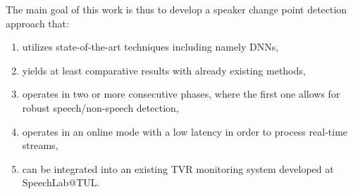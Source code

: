 \documentclass[FM,noheader,EN,bwtitles]{tulthesis}
\begin{document}


The main goal of this work is thus to develop a speaker change point detection approach that:
\begin{enumerate}
	\item utilizes state-of-the-art techniques including namely DNNs,
	\item yields at least comparative results with already existing methods,
	\item operates in two or more consecutive phases, where the first one allows for robust speech/non-speech detection,
	\item operates in an online mode with a low latency in order to process real-time streams,
	\item can be integrated into an existing TVR monitoring system developed at SpeechLab@TUL.
\end{enumerate}
\end{document}
